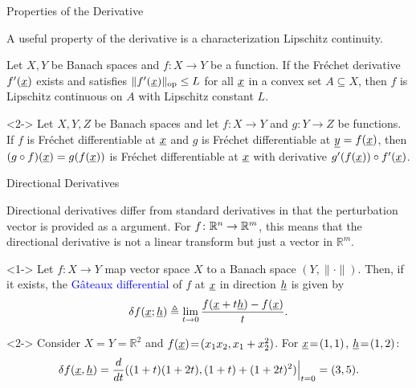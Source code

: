 \documentclass[10pt,english,aspectratio=169]{beamer}
\begin{document}
\begin{frame}{Properties of the Derivative}

A useful property of the derivative is a characterization Lipschitz continuity.

\begin{lemma}
Let $X,Y$ be Banach spaces and $f \colon X \rightarrow Y$ be a function.
If the Fr\'{e}chet derivative $f'(\underline{x})$ exists and satisfies $\| f'(\underline{x})\|_{\mathrm{op}} \leq L$ for all $\underline{x}$ in a convex set $A\subseteq X$, then $f$ is Lipschitz continuous on $A$ with Lipschitz constant $L$.
\end{lemma}

\vspace{4mm}


\begin{theorem}<2->
Let $X,Y,Z$ be Banach spaces and let $f \colon X \rightarrow Y$ and $g\colon Y \to Z$ be functions.
If $f$ is Fr\'{e}chet differentiable at $\underline{x}$ and $g$ is Fr\'{e}chet differentiable at $\underline{y}=f(\underline{x})$, then $(g \circ f) (\underline{x}) = g(f(\underline{x}))$ is Fr\'{e}chet differentiable at $\underline{x}$ with derivative $g'(f(\underline{x}))\circ f'(\underline{x})$.
\end{theorem}


\end{frame}

\begin{frame}{Directional Derivatives}

Directional derivatives differ from standard derivatives in that the perturbation vector is provided as a argument.
For $f\colon \mathbb{R}^n \to \mathbb{R}^m$, this means that the directional derivative is not a linear transform but just a vector in $\mathbb{R}^m$.

\vspace{2mm}

\begin{definition}<1->
Let $f \colon X \rightarrow Y$ map vector space $X$ to a Banach space $(Y,\|\cdot\|)$.
Then, if it exists, the \textcolor{blue}{G\^{a}teaux differential} of $f$ at  $\underline{x}$ in direction $\underline{h}$ is given by \vspace{-1.5mm}
\[ \delta f (\underline{x};\underline{h}) \triangleq \lim_{t \to 0} \frac{f(\underline{x}+t \underline{h}) - f(\underline{x})}{t}. \]
\end{definition}

\begin{example}<2->
Consider $X\!=\!Y\!=\!\mathbb{R}^2$ and $f(\underline{x})\! =\! (x_1 x_2,x_1+x_2^2)$.
For $\underline{x}\!=\!(1,1)$, $\underline{h}\!=\!(1,2)$: \vspace{-2.5mm}
\[ \delta f ( \underline{x},\underline{h} ) = \frac{d}{dt} ((1+t)(1+2t),(1+t)+(1+2t)^2) \Big|_{t=0} = (3,5). \]
\end{example}


\end{frame}
\end{document}
